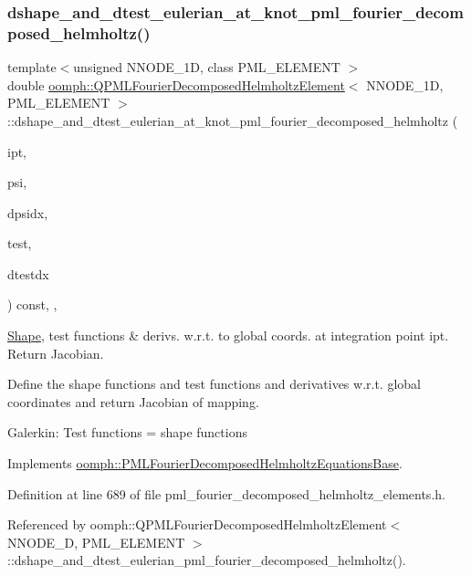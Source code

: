 \subsubsection{\texorpdfstring{dshape\+\_\+and\+\_\+dtest\+\_\+eulerian\+\_\+at\+\_\+knot\+\_\+pml\+\_\+fourier\+\_\+decomposed\+\_\+helmholtz()}{dshape\_and\_dtest\_eulerian\_at\_knot\_pml\_fourier\_decomposed\_helmholtz()}}
{\footnotesize\ttfamily template$<$unsigned N\+N\+O\+D\+E\+\_\+1D, class P\+M\+L\+\_\+\+E\+L\+E\+M\+E\+NT $>$ \\
double \hyperlink{classoomph_1_1QPMLFourierDecomposedHelmholtzElement}{oomph\+::\+Q\+P\+M\+L\+Fourier\+Decomposed\+Helmholtz\+Element}$<$ N\+N\+O\+D\+E\+\_\+1D, P\+M\+L\+\_\+\+E\+L\+E\+M\+E\+NT $>$\+::dshape\+\_\+and\+\_\+dtest\+\_\+eulerian\+\_\+at\+\_\+knot\+\_\+pml\+\_\+fourier\+\_\+decomposed\+\_\+helmholtz (\begin{DoxyParamCaption}\item[{const unsigned \&}]{ipt,  }\item[{\hyperlink{classoomph_1_1Shape}{Shape} \&}]{psi,  }\item[{\hyperlink{classoomph_1_1DShape}{D\+Shape} \&}]{dpsidx,  }\item[{\hyperlink{classoomph_1_1Shape}{Shape} \&}]{test,  }\item[{\hyperlink{classoomph_1_1DShape}{D\+Shape} \&}]{dtestdx }\end{DoxyParamCaption}) const\hspace{0.3cm}{\ttfamily [inline]}, {\ttfamily [protected]}, {\ttfamily [virtual]}}



\hyperlink{classoomph_1_1Shape}{Shape}, test functions \& derivs. w.\+r.\+t. to global coords. at integration point ipt. Return Jacobian. 

Define the shape functions and test functions and derivatives w.\+r.\+t. global coordinates and return Jacobian of mapping.

Galerkin\+: Test functions = shape functions 

Implements \hyperlink{classoomph_1_1PMLFourierDecomposedHelmholtzEquationsBase_a517cd98df2fee78db1cbdfe8fc8666e9}{oomph\+::\+P\+M\+L\+Fourier\+Decomposed\+Helmholtz\+Equations\+Base}.



Definition at line 689 of file pml\+\_\+fourier\+\_\+decomposed\+\_\+helmholtz\+\_\+elements.\+h.



Referenced by oomph\+::\+Q\+P\+M\+L\+Fourier\+Decomposed\+Helmholtz\+Element$<$ N\+N\+O\+D\+E\+\_\+D, P\+M\+L\+\_\+\+E\+L\+E\+M\+E\+N\+T $>$\+::dshape\+\_\+and\+\_\+dtest\+\_\+eulerian\+\_\+pml\+\_\+fourier\+\_\+decomposed\+\_\+helmholtz().

